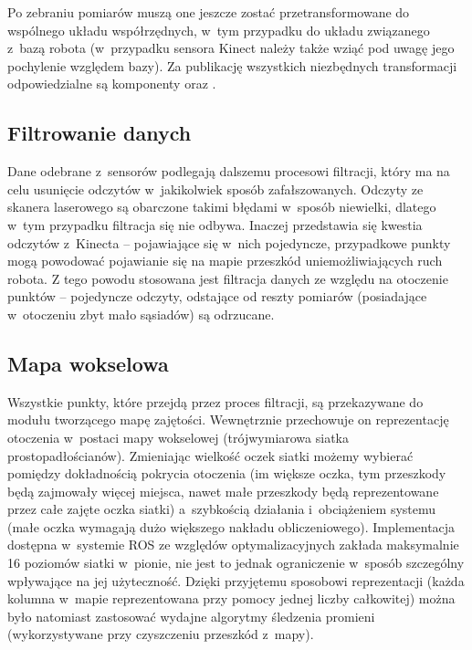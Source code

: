 Po zebraniu pomiarów muszą one jeszcze zostać przetransformowane do wspólnego
układu współrzędnych, w~tym przypadku do układu związanego z~bazą robota 
(w~przypadku sensora Kinect należy także wziąć pod uwagę jego pochylenie względem
bazy). Za publikację wszystkich niezbędnych transformacji  odpowiedzialne są
komponenty  oraz .

\subsection{Filtrowanie danych}

Dane odebrane z~sensorów podlegają dalszemu procesowi filtracji, który ma na
celu usunięcie odczytów w~jakikolwiek sposób zafałszowanych. Odczyty ze skanera
laserowego są obarczone takimi błędami w~sposób niewielki, dlatego w~tym
przypadku filtracja się nie odbywa. Inaczej przedstawia się kwestia odczytów 
z~Kinecta -- pojawiające się w~nich pojedyncze, przypadkowe punkty mogą powodować
pojawianie się na mapie przeszkód uniemożliwiających ruch robota. Z tego powodu
stosowana jest filtracja danych ze względu na otoczenie punktów -- pojedyncze
odczyty, odstające od reszty pomiarów (posiadające w~otoczeniu zbyt mało
sąsiadów) są odrzucane.

\subsection{Mapa wokselowa}

Wszystkie punkty, które przejdą przez proces filtracji, są przekazywane do
modułu tworzącego mapę zajętości. Wewnętrznie przechowuje on reprezentację
otoczenia w~postaci mapy wokselowej (trójwymiarowa siatka prostopadłościanów).
Zmieniając wielkość oczek siatki możemy wybierać pomiędzy dokładnością pokrycia
otoczenia (im większe oczka, tym przeszkody będą zajmowały więcej miejsca, nawet małe
przeszkody będą reprezentowane przez całe zajęte oczka siatki) a~szybkością
działania i~obciążeniem systemu (małe oczka wymagają dużo większego nakładu
obliczeniowego). Implementacja dostępna w~systemie ROS ze względów
optymalizacyjnych zakłada maksymalnie 16 poziomów siatki w~pionie, nie jest to
jednak ograniczenie w~sposób szczególny wpływające na jej użyteczność. Dzięki
przyjętemu sposobowi reprezentacji (każda kolumna w~mapie reprezentowana przy
pomocy jednej liczby całkowitej) można było natomiast zastosować wydajne
algorytmy śledzenia promieni (wykorzystywane przy czyszczeniu przeszkód z~mapy).

